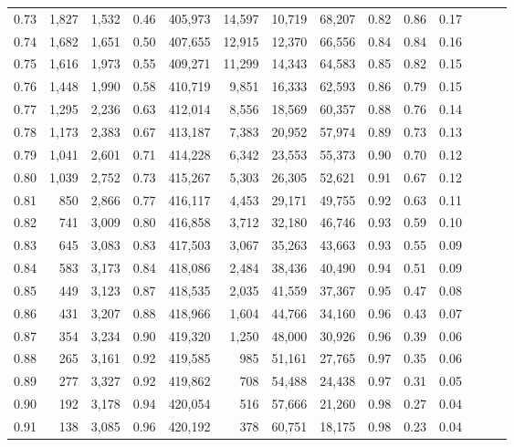\begin{tabular}{rrrrrrrrrrrrrr}
0.73 &  1,827 &  1,532 &  0.46 &  405,973 &   14,597 &  10,719 &  68,207 &  0.82 &  0.86 &      0.17 \\
0.74 &  1,682 &  1,651 &  0.50 &  407,655 &   12,915 &  12,370 &  66,556 &  0.84 &  0.84 &      0.16 \\
0.75 &  1,616 &  1,973 &  0.55 &  409,271 &   11,299 &  14,343 &  64,583 &  0.85 &  0.82 &      0.15 \\
0.76 &  1,448 &  1,990 &  0.58 &  410,719 &    9,851 &  16,333 &  62,593 &  0.86 &  0.79 &      0.15 \\
0.77 &  1,295 &  2,236 &  0.63 &  412,014 &    8,556 &  18,569 &  60,357 &  0.88 &  0.76 &      0.14 \\
0.78 &  1,173 &  2,383 &  0.67 &  413,187 &    7,383 &  20,952 &  57,974 &  0.89 &  0.73 &      0.13 \\
0.79 &  1,041 &  2,601 &  0.71 &  414,228 &    6,342 &  23,553 &  55,373 &  0.90 &  0.70 &      0.12 \\
0.80 &  1,039 &  2,752 &  0.73 &  415,267 &    5,303 &  26,305 &  52,621 &  0.91 &  0.67 &      0.12 \\
0.81 &    850 &  2,866 &  0.77 &  416,117 &    4,453 &  29,171 &  49,755 &  0.92 &  0.63 &      0.11 \\
0.82 &    741 &  3,009 &  0.80 &  416,858 &    3,712 &  32,180 &  46,746 &  0.93 &  0.59 &      0.10 \\
0.83 &    645 &  3,083 &  0.83 &  417,503 &    3,067 &  35,263 &  43,663 &  0.93 &  0.55 &      0.09 \\
0.84 &    583 &  3,173 &  0.84 &  418,086 &    2,484 &  38,436 &  40,490 &  0.94 &  0.51 &      0.09 \\
0.85 &    449 &  3,123 &  0.87 &  418,535 &    2,035 &  41,559 &  37,367 &  0.95 &  0.47 &      0.08 \\
0.86 &    431 &  3,207 &  0.88 &  418,966 &    1,604 &  44,766 &  34,160 &  0.96 &  0.43 &      0.07 \\
0.87 &    354 &  3,234 &  0.90 &  419,320 &    1,250 &  48,000 &  30,926 &  0.96 &  0.39 &      0.06 \\
0.88 &    265 &  3,161 &  0.92 &  419,585 &      985 &  51,161 &  27,765 &  0.97 &  0.35 &      0.06 \\
0.89 &    277 &  3,327 &  0.92 &  419,862 &      708 &  54,488 &  24,438 &  0.97 &  0.31 &      0.05 \\
0.90 &    192 &  3,178 &  0.94 &  420,054 &      516 &  57,666 &  21,260 &  0.98 &  0.27 &      0.04 \\
0.91 &    138 &  3,085 &  0.96 &  420,192 &      378 &  60,751 &  18,175 &  0.98 &  0.23 &      0.04 \\

\end{tabular}
